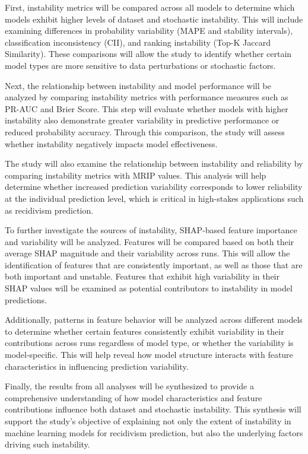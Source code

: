 \documentclass[12pt]{article}
\begin{document}
\begin{enumerate}
  First, instability metrics will be compared across all models to determine which models exhibit higher levels of dataset and stochastic instability. This will include examining differences in probability variability (MAPE and stability intervals), classification inconsistency (CII), and ranking instability (Top-K Jaccard Similarity). These comparisons will allow the study to identify whether certain model types are more sensitive to data perturbations or stochastic factors.

  Next, the relationship between instability and model performance will be analyzed by comparing instability metrics with performance measures such as PR-AUC and Brier Score. This step will evaluate whether models with higher instability also demonstrate greater variability in predictive performance or reduced probability accuracy. Through this comparison, the study will assess whether instability negatively impacts model effectiveness.

  The study will also examine the relationship between instability and reliability by comparing instability metrics with MRIP values. This analysis will help determine whether increased prediction variability corresponds to lower reliability at the individual prediction level, which is critical in high-stakes applications such as recidivism prediction.

  To further investigate the sources of instability, SHAP-based feature importance and variability will be analyzed. Features will be compared based on both their average SHAP magnitude and their variability across runs. This will allow the identification of features that are consistently important, as well as those that are both important and unstable. Features that exhibit high variability in their SHAP values will be examined as potential contributors to instability in model predictions.

  Additionally, patterns in feature behavior will be analyzed across different models to determine whether certain features consistently exhibit variability in their contributions across runs regardless of model type, or whether the variability is model-specific. This will help reveal how model structure interacts with feature characteristics in influencing prediction variability.

  Finally, the results from all analyses will be synthesized to provide a comprehensive understanding of how model characteristics and feature contributions influence both dataset and stochastic instability. This synthesis will support the study's objective of explaining not only the extent of instability in machine learning models for recidivism prediction, but also the underlying factors driving such instability.
\end{enumerate}
\newpage
\end{document}
